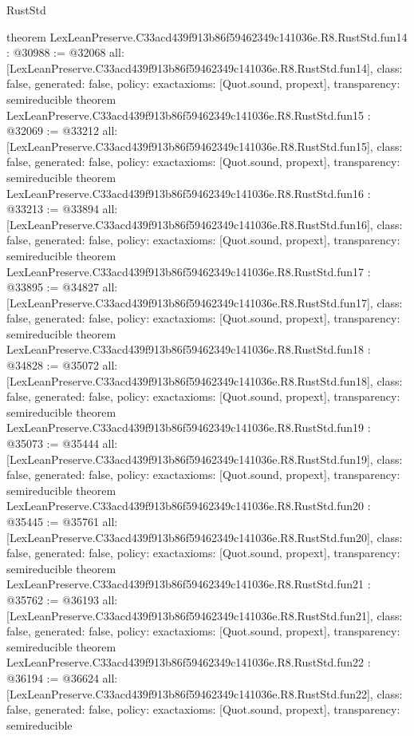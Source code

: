 \begin{lexlean}{RustStd}
\begin{coremodule}
{}
theorem LexLeanPreserve.C33acd439f913b86f59462349c141036e.R8.RustStd.fun14 : @30988 := @32068 {
  all: [LexLeanPreserve.C33acd439f913b86f59462349c141036e.R8.RustStd.fun14],
  class: false,
  generated: false,
  policy: exact{axioms: [Quot.sound, propext]},
  transparency: semireducible
}
theorem LexLeanPreserve.C33acd439f913b86f59462349c141036e.R8.RustStd.fun15 : @32069 := @33212 {
  all: [LexLeanPreserve.C33acd439f913b86f59462349c141036e.R8.RustStd.fun15],
  class: false,
  generated: false,
  policy: exact{axioms: [Quot.sound, propext]},
  transparency: semireducible
}
theorem LexLeanPreserve.C33acd439f913b86f59462349c141036e.R8.RustStd.fun16 : @33213 := @33894 {
  all: [LexLeanPreserve.C33acd439f913b86f59462349c141036e.R8.RustStd.fun16],
  class: false,
  generated: false,
  policy: exact{axioms: [Quot.sound, propext]},
  transparency: semireducible
}
theorem LexLeanPreserve.C33acd439f913b86f59462349c141036e.R8.RustStd.fun17 : @33895 := @34827 {
  all: [LexLeanPreserve.C33acd439f913b86f59462349c141036e.R8.RustStd.fun17],
  class: false,
  generated: false,
  policy: exact{axioms: [Quot.sound, propext]},
  transparency: semireducible
}
theorem LexLeanPreserve.C33acd439f913b86f59462349c141036e.R8.RustStd.fun18 : @34828 := @35072 {
  all: [LexLeanPreserve.C33acd439f913b86f59462349c141036e.R8.RustStd.fun18],
  class: false,
  generated: false,
  policy: exact{axioms: [Quot.sound, propext]},
  transparency: semireducible
}
theorem LexLeanPreserve.C33acd439f913b86f59462349c141036e.R8.RustStd.fun19 : @35073 := @35444 {
  all: [LexLeanPreserve.C33acd439f913b86f59462349c141036e.R8.RustStd.fun19],
  class: false,
  generated: false,
  policy: exact{axioms: [Quot.sound, propext]},
  transparency: semireducible
}
theorem LexLeanPreserve.C33acd439f913b86f59462349c141036e.R8.RustStd.fun20 : @35445 := @35761 {
  all: [LexLeanPreserve.C33acd439f913b86f59462349c141036e.R8.RustStd.fun20],
  class: false,
  generated: false,
  policy: exact{axioms: [Quot.sound, propext]},
  transparency: semireducible
}
theorem LexLeanPreserve.C33acd439f913b86f59462349c141036e.R8.RustStd.fun21 : @35762 := @36193 {
  all: [LexLeanPreserve.C33acd439f913b86f59462349c141036e.R8.RustStd.fun21],
  class: false,
  generated: false,
  policy: exact{axioms: [Quot.sound, propext]},
  transparency: semireducible
}
theorem LexLeanPreserve.C33acd439f913b86f59462349c141036e.R8.RustStd.fun22 : @36194 := @36624 {
  all: [LexLeanPreserve.C33acd439f913b86f59462349c141036e.R8.RustStd.fun22],
  class: false,
  generated: false,
  policy: exact{axioms: [Quot.sound, propext]},
  transparency: semireducible
}
\end{coremodule}
\end{lexlean}
